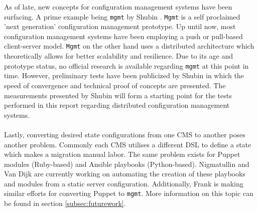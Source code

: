 As of late, new concepts for configuration management systems have been surfacing. A prime example being \texttt{mgmt} by Shubin \cite{shubin2016}. \texttt{Mgmt} is a self proclaimed 'next generation' configuration management prototype. Up until now, most configuration management systems have been employing a push or pull-based client-server model. \texttt{Mgmt} on the other hand uses a distributed architecture which theoretically allows for better scalability and resilience. Due to its age and prototype status, no official research is available regarding \texttt{mgmt} at this point in time. However, preliminary tests have been publicized by Shubin in which the speed of convergence and technical proof of concepts are presented. The measurements presented by Shubin will form a starting point for the tests performed in this report regarding distributed configuration management systems. 
\\\\
Lastly, converting desired state configurations from one CMS to another poses another problem. Commonly each CMS utilises a different DSL to define a state which makes a migration manual labor. The same problem exists for Puppet modules (Ruby-based) and Ansible playbooks (Python-based). Nigmatullin and Van Dijk \cite{marat_2016} are currently working on automating the creation of these playbooks and modules from a static server configuration. Additionally, Frank \cite{frank_2016} is making similar efforts for converting Puppet to \texttt{mgmt}. More information on this topic can be found in section \ref{subsec:futurework}. 
